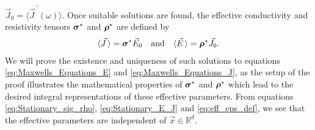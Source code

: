 \documentclass[11pt]{amsart}
\newcommand\bsig{\mbox{\boldmath${\sigma}$}}
\newcommand\brho{\mbox{\boldmath${\rho}$}}
\begin{document}
$\vec{J}_0=\langle\vec{J}^{\,\prime}(\omega)\rangle$. Once suitable solutions are 
found, the effective conductivity and resistivity tensors $\bsig^*$
and $\brho^*$ are defined by \cite{Golden:CMP-473}    
%
\begin{align}\label{eq:eff_eps_def}
    \langle \vec{J} \,\rangle=  \bsig^* \vec{E}_0
    \quad \text{and} \quad    
    \langle \vec{E} \,\rangle=  \brho^*\vec{J}_0.
\end{align}
%
We will prove the existence and uniqueness of such solutions to equations
\eqref{eq:Maxwells_Equations_E} and \eqref{eq:Maxwells_Equations_J},
as the setup of the proof illustrates the mathematical properties of
$\bsig^*$ and $\brho^*$ which lead to the desired integral
representations of these effective parameters. From equations
\eqref{eq:Stationary_sig_rho}, \eqref{eq:Stationary_E_J} and
\eqref{eq:eff_eps_def}, we see that the effective parameters are
independent of $\vec{x}\in\mathbb{R}^d$.  
\end{document}
